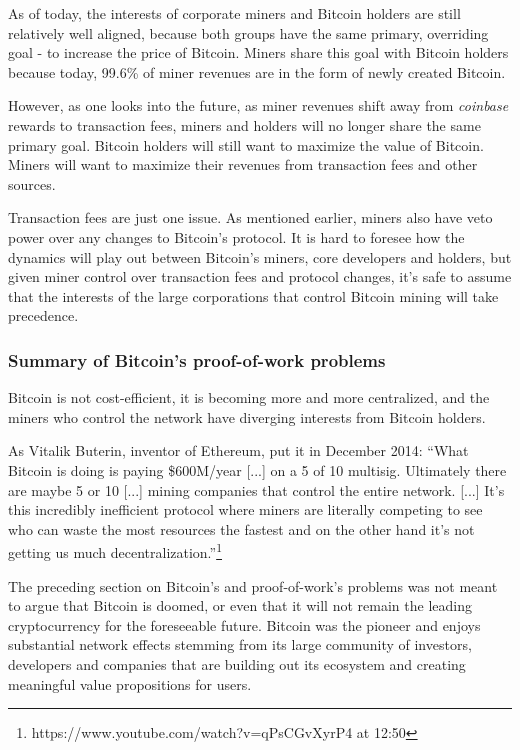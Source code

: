 \documentclass[a4paper,11pt]{article}
\begin{document}
As of today, the interests of corporate miners and Bitcoin holders are still relatively well aligned, because both groups have the same primary, overriding goal - to increase the price of Bitcoin. Miners share this goal with Bitcoin holders because today, 99.6\% of miner revenues are in the form of newly created Bitcoin.

However, as one looks into the future, as miner revenues shift away from \textit{coinbase} rewards to transaction fees, miners and holders will no longer share the same primary goal. Bitcoin holders will still want to maximize the value of Bitcoin. Miners will want to maximize their revenues from transaction fees and other sources.

Transaction fees are just one issue. As mentioned earlier, miners also have veto power over any changes to Bitcoin's protocol. It is hard to foresee how the dynamics will play out between Bitcoin's miners, core developers and holders, but given miner control over transaction fees and protocol changes, it's safe to assume that the interests of the large corporations that control Bitcoin mining will take precedence.

\subsubsection{Summary of Bitcoin's proof-of-work problems}

Bitcoin is not cost-efficient, it is becoming more and more centralized, and the miners who control the network have diverging interests from Bitcoin holders. 

As Vitalik Buterin, inventor of Ethereum, put it in December 2014:
``What Bitcoin is doing is paying \$600M/year [...] on a 5 of 10 multisig. Ultimately there are maybe 5 or 10 [...] mining companies that control the entire network. [...] It's this incredibly inefficient protocol where miners are literally competing to see who can waste the most resources the fastest and on the other hand it's not getting us much decentralization.''\footnote{https://www.youtube.com/watch?v=qPsCGvXyrP4 at 12:50}

The preceding section on Bitcoin's and proof-of-work's problems was not meant to argue that Bitcoin is doomed, or even that it will not remain the leading cryptocurrency for the foreseeable future. Bitcoin was the pioneer and enjoys substantial network effects stemming from its large community of investors, developers and companies that are building out its ecosystem and creating meaningful value propositions for users.
\end{document}
